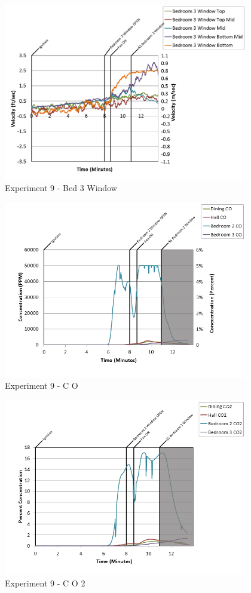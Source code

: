 \documentclass{article}
\begin{document}
\begin{appendices}
\begin{figure}[h!]
	\centering
	\includegraphics[height=3.05in]{0_Images/Results_Charts/Exp_9_Charts/Bed3Window.png}
	\caption{Experiment 9 - Bed 3 Window}
\end{figure}

\clearpage

\begin{figure}[h!]
	\centering
	\includegraphics[height=3.05in]{0_Images/Results_Charts/Exp_9_Charts/CO.png}
	\caption{Experiment 9 - C O}
\end{figure}


\begin{figure}[h!]
	\centering
	\includegraphics[height=3.05in]{0_Images/Results_Charts/Exp_9_Charts/CO2.png}
	\caption{Experiment 9 - C O 2}
\end{figure}


\end{appendices}
\end{document}

